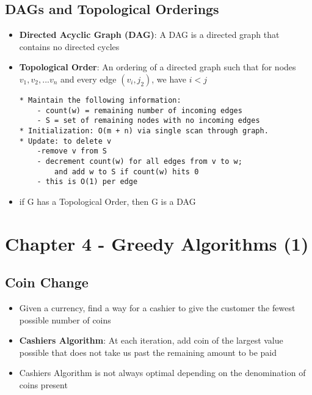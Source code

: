 \documentclass[notitlepage]{article}
\begin{document}
    \subsection{DAGs and Topological Orderings}
    \begin{itemize}
        \item \textbf{Directed Acyclic Graph (DAG)}: A DAG is a directed graph that contains no directed
            cycles
        \item \textbf{Topological Order}: An ordering of a directed graph such that for nodes $v_1,v_2,...v_n$ 
            and every edge $(v_i, j_2)$, we have $i < j$
\begin{verbatim}
* Maintain the following information:
    - count(w) = remaining number of incoming edges
    - S = set of remaining nodes with no incoming edges
* Initialization: O(m + n) via single scan through graph.
* Update: to delete v
    -remove v from S
    - decrement count(w) for all edges from v to w; 
        and add w to S if count(w) hits 0
    - this is O(1) per edge
\end{verbatim}
        \item if G has a Topological Order, then G is a DAG            
    \end{itemize}

 \section{Chapter 4 - Greedy Algorithms (1)}
    \subsection{Coin Change}
    \begin{itemize}
        \item Given a currency, find a way for a cashier to give the customer the fewest possible number of coins
        \item \textbf{Cashiers Algorithm}: At each iteration, add coin of the largest value possible that does not take
            us past the remaining amount to be paid
        \item Cashiers Algorithm is not always optimal depending on the denomination of coins present
    \end{itemize}
    
\end{document}
